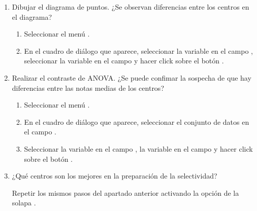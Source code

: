 \begin {enumerate}[leftmargin=*]
\begin{enumerate}
\item Dibujar el diagrama de puntos. ¿Se observan diferencias entre los centros en el diagrama?
\begin{indicacion}
\begin{enumerate}
\item Seleccionar el menú .
\item En el cuadro de diálogo que aparece, seleccionar la variable  en el campo , seleccionar la
variable  en el campo  y hacer click sobre el botón .
\end{enumerate}
\end{indicacion}

\item Realizar el contraste de ANOVA. 
¿Se puede confimar la sospecha de que hay diferencias entre las notas medias de los centros?
\begin{indicacion}
\begin{enumerate}
\item Seleccionar el menú .
\item En el cuadro de diálogo que aparece, seleccionar el conjunto de datos  en el campo .
\item Seleccionar la variable  en el campo , la variable
 en el campo  y hacer click sobre el botón .
\end{enumerate}
\end{indicacion}

\item ¿Qué centros son los mejores en la preparación de la selectividad?
\begin{indicacion} 
Repetir los mismos pasos del apartado anterior activando la opción  de la solapa .
\end{indicacion}
\end{enumerate}

\end{enumerate}


